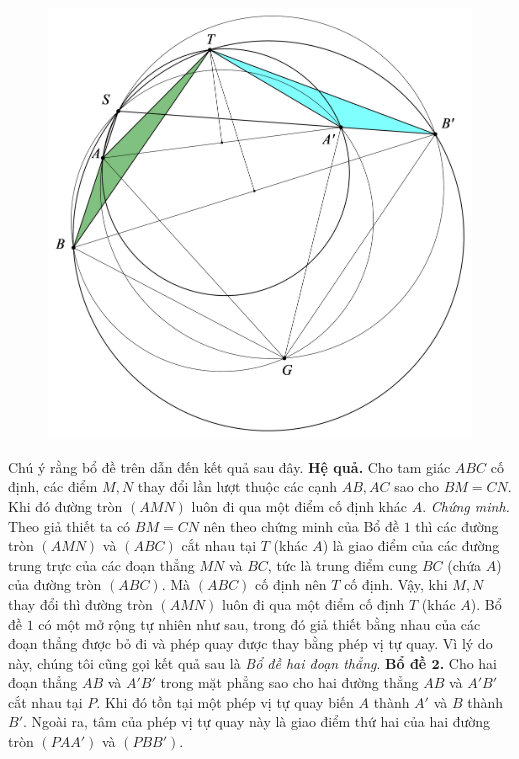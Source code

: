 \begin{multicols}{2}
\begin{figure}[H]
		\includegraphics[scale=0.63]{1}
		\vspace*{-5pt}
	\end{figure}
	Chú ý rằng bổ đề trên dẫn đến kết quả sau đây.
	\vskip 0.1cm
	\textbf{\color{hoccungpi}Hệ quả.} Cho tam giác $ABC$ cố định, các điểm $M,N$ thay đổi lần lượt thuộc các cạnh $AB,AC$ sao cho $BM=CN$. Khi đó đường tròn $(AMN)$ luôn đi qua một điểm cố định khác $A$.
	\vskip 0.1cm
	\textit{Chứng minh.} Theo giả thiết ta có $BM=CN$ nên theo chứng minh của Bổ đề $1$ thì các đường tròn $(AMN)$ và $(ABC)$ cắt nhau tại $T$ (khác $A$) là giao điểm của các đường trung trực của các đoạn thẳng $MN$ và $BC$, tức là trung điểm cung $BC$ (chứa $A$) của đường tròn $(ABC)$. Mà $(ABC)$ cố định nên $T$ cố định. Vậy,  khi $M,N$ thay đổi thì đường tròn $(AMN)$ luôn đi qua một điểm cố định $T$ (khác $A$).	\vskip 0.1cm
	\vskip 0.1cm
	Bổ đề $1$ có một mở rộng tự nhiên như sau, trong đó giả thiết bằng nhau của các đoạn thẳng được bỏ đi và phép quay được thay bằng phép vị tự quay. Vì lý do này, chúng tôi cũng gọi kết quả sau là \textit{Bổ đề hai đoạn thẳng}.
	\vskip 0.1cm
	\textbf{\color{hoccungpi}Bổ đề $\pmb{2}$.} Cho hai đoạn thẳng $AB$ và $A'B'$ trong mặt phẳng sao cho hai đường thẳng $AB$ và $A'B'$ cắt nhau tại $P$. Khi đó tồn tại một phép vị tự quay biến $A$ thành $A'$ và $B$ thành $B'$. Ngoài ra, tâm của phép vị tự quay này là giao điểm thứ hai của hai đường tròn $(PAA')$ và $(PBB')$.

\end{multicols}
